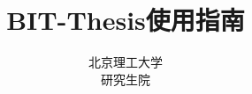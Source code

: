 \documentclass[cs4size, a4paper, oneside, openany]{bitmaster-xetex}
\begin{document}

\title{BIT-Thesis使用指南}
\author{北京理工大学\\研究生院}

\maketitle





\frontmatter
{}


%

\tableofcontents


% 

\mainmatter  %







\appendix  %

\renewcommand\theequation{\Alph{chapter}--\arabic{equation}}
\renewcommand\thefigure{\Alph{chapter}--\arabic{figure}}
\renewcommand\thetable{\Alph{chapter}--\arabic{table}}



\backmatter

{
%
}
%

\end{document}
